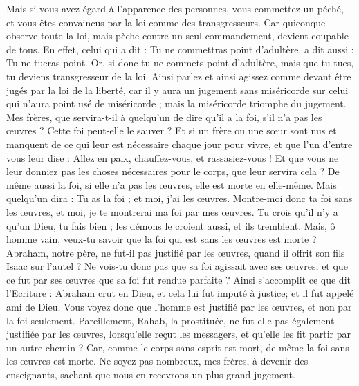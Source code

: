 \begin{multicols}{2}
Mais si vous avez égard à l'apparence des personnes, vous commettez un péché, et vous êtes convaincus par la loi comme des transgresseurs.
Car quiconque observe toute la loi, mais pèche contre un seul commandement, devient coupable de tous.
En effet, celui qui a dit : Tu ne commettras point d'adultère, a dit aussi : Tu ne tueras point. Or, si donc tu ne commets point d'adultère, mais que tu tues, tu deviens transgresseur de la loi.
Ainsi parlez et ainsi agissez comme devant être jugés par la loi de la liberté,
car il y aura un jugement sans miséricorde sur celui qui n'aura point usé de miséricorde ; mais la miséricorde triomphe du jugement.
Mes frères, que servira-t-il à quelqu'un de dire qu'il a la foi, s'il n'a pas les œuvres ? Cette foi peut-elle le sauver ?
Et si un frère ou une sœur sont nus et manquent de ce qui leur est nécessaire chaque jour pour vivre,
et que l'un d'entre vous leur dise : Allez en paix, chauffez-vous, et rassasiez-vous ! Et que vous ne leur donniez pas les choses nécessaires pour le corps, que leur servira cela ?
De même aussi la foi, si elle n'a pas les œuvres, elle est morte en elle-même.
Mais quelqu'un dira : Tu as la foi ; et moi, j'ai les œuvres. Montre-moi donc ta foi sans les œuvres, et moi, je te montrerai ma foi par mes œuvres.
Tu crois qu'il n'y a qu'un Dieu, tu fais bien ; les démons le croient aussi, et ils tremblent.
Mais, ô homme vain, veux-tu savoir que la foi qui est sans les œuvres est morte ?
Abraham, notre père, ne fut-il pas justifié par les œuvres, quand il offrit son fils Isaac sur l'autel ?
Ne vois-tu donc pas que sa foi agissait avec ses œuvres, et que ce fut par ses œuvres que sa foi fut rendue parfaite ?
Ainsi s'accomplit ce que dit l'Ecriture : Abraham crut en Dieu, et cela lui fut imputé à justice; et il fut appelé ami de Dieu.
Vous voyez donc que l'homme est justifié par les œuvres, et non par la foi seulement.
Pareillement, Rahab, la prostituée, ne fut-elle pas également justifiée par les œuvres, lorsqu'elle reçut les messagers, et qu'elle les fit partir par un autre chemin ?
Car, comme le corps sans esprit est mort, de même la foi sans les œuvres est morte.
\VerseOne{}Ne soyez pas nombreux, mes frères, à devenir des enseignants, sachant que nous en recevrons un plus grand jugement.

\end{multicols}
